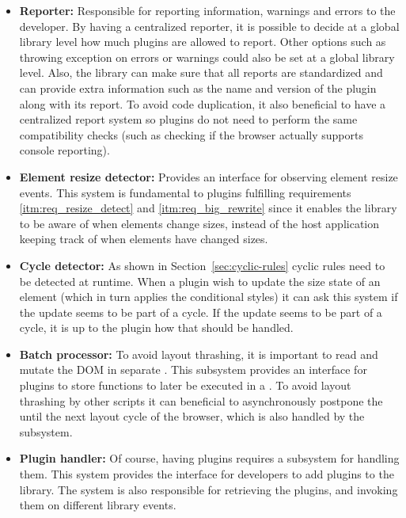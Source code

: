 \documentclass[a4paper,11pt]{kth-mag}
\begin{document}
      \begin{itemize}
        \item \textbf{Reporter:}
          Responsible for reporting information, warnings and errors to the developer.
          By having a centralized reporter, it is possible to decide at a global library level how much plugins are allowed to report.
          Other options such as throwing exception on errors or warnings could also be set at a global library level.
          Also, the library can make sure that all reports are standardized and can provide extra information such as the name and version of the plugin along with its report.
          To avoid code duplication, it also beneficial to have a centralized report system so plugins do not need to perform the same compatibility checks (such as checking if the \gls{browser} actually supports console reporting).
        \item \textbf{Element resize detector:}
          Provides an interface for observing \gls{element} resize events.
          This system is fundamental to plugins fulfilling requirements \ref{itm:req_resize_detect} and \ref{itm:req_big_rewrite} since it enables the library to be aware of when \glspl{element} change sizes, instead of the host application keeping track of when \glspl{element} have changed sizes.
        \item \textbf{Cycle detector:}
          As shown in Section~\ref{sec:cyclic-rules} cyclic rules need to be detected at runtime.
          When a plugin wish to update the size state of an \gls{element} (which in turn applies the conditional styles) it can ask this system if the update seems to be part of a cycle.
          If the update seems to be part of a cycle, it is up to the plugin how that should be handled.
        \item \textbf{Batch processor:}
          To avoid \gls{layout thrashing}, it is important to read and mutate the \gls{DOM} in separate .
          This subsystem provides an interface for plugins to store functions to later be executed in a .
          To avoid \gls{layout thrashing} by other scripts it can beneficial to asynchronously postpone the  until the next layout cycle of the \gls{browser}, which is also handled by the subsystem.
        \item \textbf{Plugin handler:}
          Of course, having plugins requires a subsystem for handling them.
          This system provides the interface for developers to add plugins to the library.
          The system is also responsible for retrieving the plugins, and invoking them on different library events.
      \end{itemize}
\end{document}
